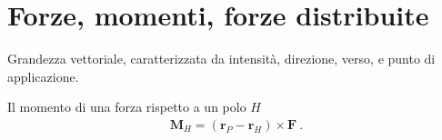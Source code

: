 \documentclass[letterpaper,10pt,english]{jupyterBook}
\begin{document}
\section{Forze, momenti, forze distribuite}
\label{\detokenize{ch/actions-types:forze-momenti-forze-distribuite}}\label{\detokenize{ch/actions-types:classical-mechanics-actions-density}}\label{\detokenize{ch/actions-types::doc}}
\sphinxAtStartPar
{} Grandezza vettoriale, caratterizzata da intensità, direzione, verso, e punto di applicazione.

\sphinxAtStartPar
{} Il momento di una forza rispetto a un polo \(H\)
\begin{equation*}
\begin{split}\mathbf{M}_H = (\mathbf{r}_P - \mathbf{r}_H) \times \mathbf{F} \ .\end{split}
\end{equation*}
\sphinxAtStartPar
{} 

\sphinxstepscope
\end{document}
